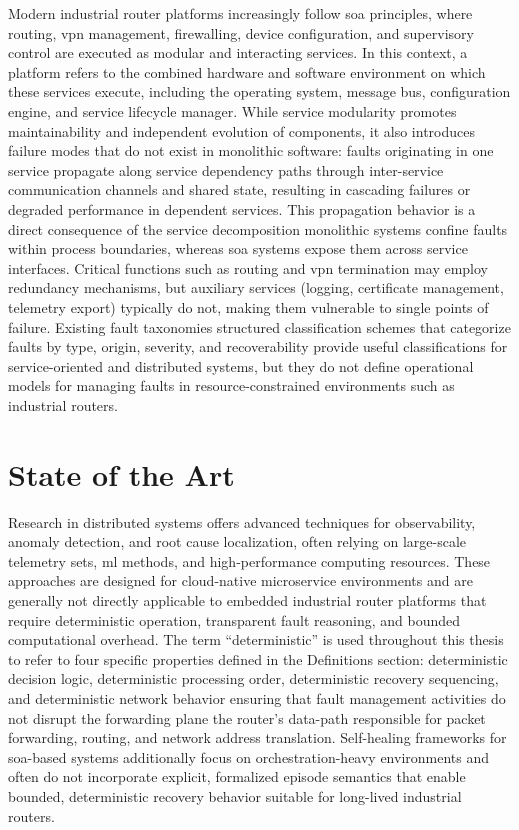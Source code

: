 Modern industrial router platforms increasingly follow \gls{soa} principles, where routing, \gls{vpn} management, firewalling, device configuration, and supervisory control are executed as modular and interacting services. In this context, a platform refers to the combined hardware and software environment on which these services execute, including the operating system, message bus, configuration engine, and service lifecycle manager. While service modularity promotes maintainability and independent evolution of components, it also introduces failure modes that do not exist in monolithic software: faults originating in one service propagate along service dependency paths through inter-service communication channels and shared state, resulting in cascading failures or degraded performance in dependent services. This propagation behavior is a direct consequence of the service decomposition monolithic systems confine faults within process boundaries, whereas \gls{soa} systems expose them across service interfaces. Critical functions such as routing and \gls{vpn} termination may employ redundancy mechanisms, but auxiliary services (logging, certificate management, telemetry export) typically do not, making them vulnerable to single points of failure. Existing fault taxonomies structured classification schemes that categorize faults by type, origin, severity, and recoverability provide useful classifications for service-oriented and distributed systems, but they do not define operational models for managing faults in resource-constrained environments such as industrial routers.

\section{State of the Art}\label{sec:intro-state-of-art}

Research in distributed systems offers advanced techniques for observability, anomaly detection, and root cause localization, often relying on large-scale telemetry sets, \gls{ml} methods, and high-performance computing resources. These approaches are designed for cloud-native microservice environments and are generally not directly applicable to embedded industrial router platforms that require deterministic operation, transparent fault reasoning, and bounded computational overhead. The term ``deterministic'' is used throughout this thesis to refer to four specific properties defined in the Definitions section: deterministic decision logic, deterministic processing order, deterministic recovery sequencing, and deterministic network behavior ensuring that fault management activities do not disrupt the forwarding plane the router's data-path responsible for packet forwarding, routing, and network address translation. Self-healing frameworks for \gls{soa}-based systems additionally focus on orchestration-heavy environments and often do not incorporate explicit, formalized episode semantics that enable bounded, deterministic recovery behavior suitable for long-lived industrial routers.

